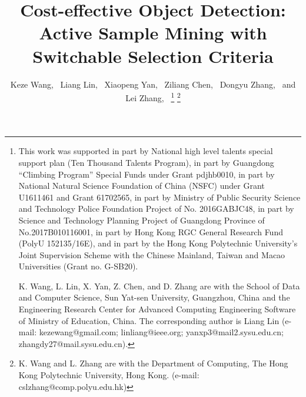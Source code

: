 \documentclass[journal]{IEEEtran}
\begin{document}
%
\title{Cost-effective Object Detection: Active Sample Mining with Switchable Selection Criteria}
%
%
%

\author{Keze Wang,~
        Liang Lin,~
        Xiaopeng Yan,~
        Ziliang Chen,~
        Dongyu Zhang,~
        and Lei Zhang,~
\thanks{This work was supported in part by National high level talents special support plan (Ten Thousand Talents Program),  in part by Guangdong ``Climbing Program'' Special Funds under Grant pdjhb0010, in part by National Natural Science Foundation of China (NSFC) under Grant U1611461 and Grant 61702565, in part by Ministry of Public Security Science and Technology Police Foundation Project of No. 2016GABJC48, in part by Science and Technology Planning Project of Guangdong Province of No.2017B010116001, in part by Hong Kong RGC General Research Fund (PolyU 152135/16E), and in part by the Hong Kong Polytechnic University’s Joint Supervision Scheme with the Chinese Mainland, Taiwan and Macao Universities (Grant no. G-SB20). 

K. Wang, L. Lin, X. Yan, Z. Chen, and D. Zhang are with the School of Data and Computer Science, Sun Yat-sen University, Guangzhou, China and the Engineering Research Center for Advanced Computing Engineering Software of Ministry of Education, China. The corresponding author is Liang Lin (e-mail: kezewang@gmail.com; linliang@ieee.org; yanxp3@mail2.sysu.edu.cn; zhangdy27@mail.sysu.edu.cn).}
\thanks{K. Wang and L. Zhang are with the Department of Computing, The Hong Kong Polytechnic University, Hong Kong. (e-mail: cslzhang@comp.polyu.edu.hk)}
}
\end{document}
